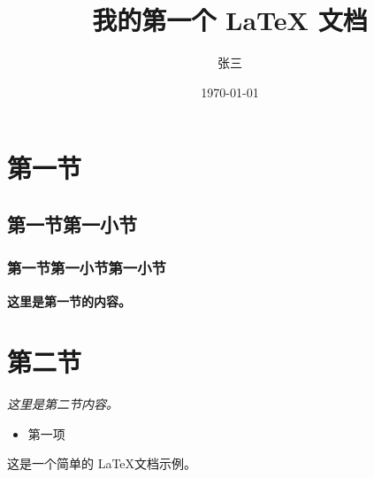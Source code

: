 \documentclass{ctexart}
\title{我的第一个 LaTeX 文档}
\author{张三}
\date{\today} %
\begin{document}
\maketitle
\section{第一节}
\subsection{第一节第一小节}
\subsubsection{第一节第一小节第一小节}
\textbf{这里是第一节的内容。}
\section{第二节}
\textit{这里是第二节内容。}
\begin{itemize}
    \item 第一项
\end{itemize}
这是一个简单的 \LaTeX 文档示例。
\end{document}
